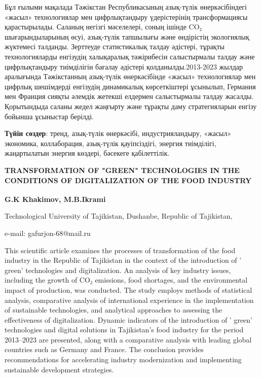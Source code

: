 Бұл ғылыми мақалада Тәжікстан Республикасының азық-түлік өнеркәсібіндегі
«жасыл» технологиялар мен цифрлықтандыру үдерістерінің трансформациясы
қарастырылады. Саланың негізгі мәселелері, соның ішінде CO₂
шығарындыларының өсуі, азық-түлік тапшылығы және өндірістің экологиялық
жүктемесі талданды. Зерттеуде статистикалық талдау әдістері, тұрақты
технологияларды енгізудің халықаралық тәжірибесін салыстырмалы талдау
және цифрлықтандыру тиімділігін бағалау әдістері қолданылды.2013-2023
жылдар аралығында Тәжікстанның азық-түлік өнеркәсібінде «жасыл»
технологиялар мен цифрлық шешімдерді енгізудің динамикалық көрсеткіштері
ұсынылып, Германия мен Франция сияқты әлемдік жетекші елдермен
салыстырмалы талдау жасалды. Қорытындыда саланы жедел жаңғырту және
тұрақты даму стратегияларын енгізу бойынша ұсыныстар берілді.

{\bfseries Түйін сөздер}: тренд, азық-түлік өнеркәсібі, индустрияландыру,
«жасыл» экономика, коллаборация, азық-түлік қауіпсіздігі, энергия
тиімділігі, жаңартылатын энергия көздері, бәсекеге қабілеттілік.

\begin{articleheader}
{\bfseries TRANSFORMATION OF "GREEN" TECHNOLOGIES IN THE CONDITIONS OF DIGITALIZATION OF THE FOOD INDUSTRY}

{\bfseries
G.K Khakimov\textsuperscript{\envelope },
M.B.Ikrami
}
\end{articleheader}

\begin{affiliation}
Technological University of Tajikistan, Dushanbe, Republic of Tajikistan,

e-mail: gafurjon-68@mail.ru
\end{affiliation}

This scientific article examines the processes of transformation of the
food industry in the Republic of Tajikistan in the context of the
introduction of ' green'{} technologies
and digitalization. An analysis of key industry issues, including the
growth of CO₂ emissions, food shortages, and the environmental impact of
production, was conducted. The study employs methods of statistical
analysis, comparative analysis of international experience in the
implementation of sustainable technologies, and analytical approaches to
assessing the effectiveness of digitalization. Dynamic indicators of the
introduction of ' green'{} technologies
and digital solutions in Tajikistan's food industry for the period
2013--2023 are presented, along with a comparative analysis with leading
global countries such as Germany and France. The conclusion provides
recommendations for accelerating industry modernization and implementing
sustainable development stra\-tegies.

